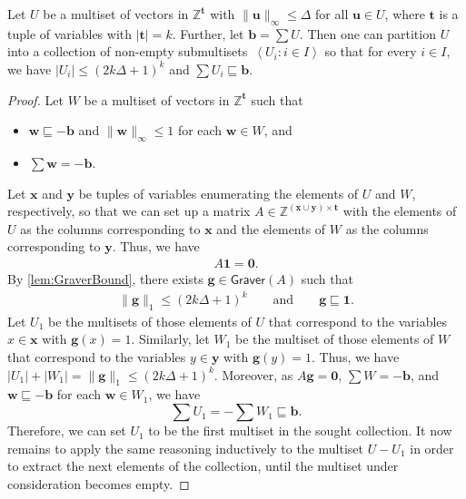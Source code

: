 \documentclass{theoretics}
\renewcommand{\leq}{\leqslant}
\newcommand{\cfleq}{\sqsubseteq}
\newcommand{\Z}{\mathbb{Z}}
\newcommand{\tup}[1]{{\mathbf{#1}}}
\newcommand{\xx}{\tup x}
\newcommand{\ww}{\tup w}
\newcommand{\yy}{\tup y}
\newcommand{\tv}{\tup t}
\newcommand{\bb}{\tup b}
\renewcommand{\gg}{\tup g}
\newcommand{\uu}{\tup u}
\newcommand{\Graver}{\mathsf{Graver}}
\newcommand{\zero}{\tup 0}
\newcommand{\mset}[1]{\left\langle #1\right\rangle}
\renewcommand{\setminus}{-}
\begin{document}
\begin{lemma}\label{lem:bundling}
    Let $U$ be a multiset of vectors in $\Z^\tv$ with $\|\uu\|_\infty\leq \Delta$ for all $\uu\in U$, where $\tv$ is a tuple of variables with $|\tv|=k$. Further, let $\bb=\sum U$. Then one can partition $U$ into a collection of non-empty submultisets~$\mset{U_i\colon i\in I}$ so that for every $i\in I$, we have $|U_i|\leq (2k\Delta+1)^{k}$ and $\sum U_i \cfleq \bb$.
\end{lemma}
\begin{proof}
    Let $W$ be a multiset of vectors in $\Z^{\tv}$ such that
    \begin{itemize}[nosep]
        \item $\ww\cfleq -\bb$ and $\|\ww\|_\infty\leq 1$ for each $\ww\in W$, and
        \item $\sum \ww = -\bb$.
    \end{itemize}
    Let $\xx$ and $\yy$ be tuples of variables enumerating the elements of $U$ and $W$, respectively, so that we can set up a matrix $A\in \Z^{(\xx\cup \yy)\times \tv}$ with the elements of $U$ as the columns corresponding to $\xx$ and the elements of $W$ as the columns corresponding to $\yy$. Thus, we have
    \begin{align*}
        A\mathbf{1}=\zero.
    \end{align*}
    By \cref{lem:GraverBound}, there exists $\gg\in \Graver(A)$ such that
    \begin{align*}
        \|\gg\|_1\leq (2k\Delta+1)^{k}\qquad\textrm{and}\qquad \gg\cfleq \mathbf{1}.
    \end{align*}
    Let $U_1$ be the multisets of those elements of $U$ that correspond to the variables $x\in \xx$ with $\gg(x)=1$. Similarly, let $W_1$ be the multiset of those elements of $W$ that correspond to the variables $y\in \yy$ with $\gg(y)=1$. Thus, we have $|U_1|+|W_1|=\|\gg\|_1\leq (2k\Delta+1)^{k}$. Moreover, as $A\gg=\zero$, $\sum W=-\bb$, and $\ww\cfleq -\bb$ for each $\ww\in W_1$, we have
    \[\sum U_1=-\sum W_1\cfleq \bb.\]
    Therefore, we can set $U_1$ to be the first multiset in the sought collection. It now remains to apply the same reasoning inductively to the multiset $U\setminus U_1$ in order to extract the next elements of the collection, until the multiset under consideration becomes empty.
\end{proof}
\end{document}
